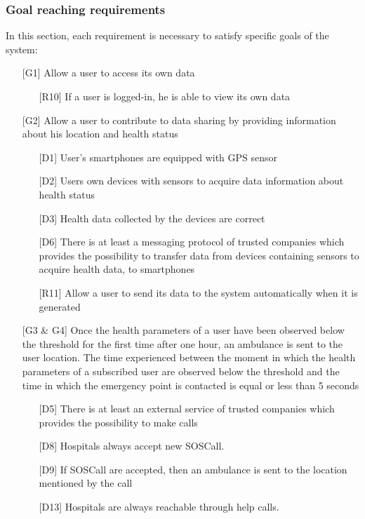 \subsubsection{Goal reaching requirements}
\par
In this section, each requirement is necessary to satisfy specific goals of the system:
\begin{itemize}
\item[{[G1]}] Allow a user to access its own data
	\begin{itemize}
	\item[{[R10]}] If a user is logged-in, he is able to view its own data
	\end{itemize}
\item[{[G2]}] Allow a user to contribute to data sharing by providing information about his location and health status
	\begin{itemize}
	\item[{[D1]}]  User's smartphones are equipped with GPS sensor
	\item[{[D2]}] Users own devices with sensors to acquire data information about health status
	\item[{[D3]}] Health data collected by the devices are correct
	\item[{[D6]}] There is at least a messaging protocol of trusted companies which provides the possibility to transfer data from devices containing sensors to acquire health data, to smartphones
	\item[{[R11]}] Allow a user to send its data to the system automatically when it is generated
	\end{itemize}
\item[{[G3 \& G4]}] Once the health parameters of a user have been observed 
below the threshold for the first time after one hour, an ambulance is sent to the user location. 
The time experienced between the moment in which the health parameters of a subscribed user are observed below the threshold and the time in which the emergency point is contacted is equal or less than 5 seconds
	\begin{itemize}
	\item[{[D5]}] There is at least an external service of trusted companies which provides the possibility to make calls
	\item[{[D8]}] Hospitals always accept new SOSCall.
	\item[{[D9]}] If SOSCall are accepted, then an ambulance is sent to the location mentioned by the call
	\item[{[D13]}] Hospitals are always reachable through help calls.

\end{itemize}
\end{itemize}
